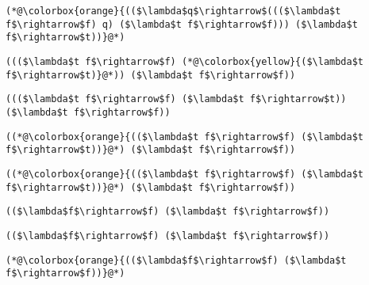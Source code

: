 \documentclass{beamer}
\begin{document}
\begin{frame}[fragile]{\CurrentSection}
\lstset{basicstyle=\ttfamily\small}\lstset{numbers=none}\lstset{language=ML}\begin{lstlisting}
(*@\colorbox{orange}{(($\lambda$q$\rightarrow$((($\lambda$t f$\rightarrow$f) q) ($\lambda$t f$\rightarrow$f))) ($\lambda$t f$\rightarrow$t))}@*)
\end{lstlisting}
\pause\lstset{language=ML}\begin{lstlisting}
((($\lambda$t f$\rightarrow$f) (*@\colorbox{yellow}{($\lambda$t f$\rightarrow$t)}@*)) ($\lambda$t f$\rightarrow$f))
\end{lstlisting}

\end{frame}

\begin{frame}[fragile]{\CurrentSection}
\lstset{basicstyle=\ttfamily\small}\lstset{numbers=none}\lstset{language=ML}\begin{lstlisting}
((($\lambda$t f$\rightarrow$f) ($\lambda$t f$\rightarrow$t)) ($\lambda$t f$\rightarrow$f))
\end{lstlisting}
\pause\lstset{language=ML}\begin{lstlisting}
((*@\colorbox{orange}{(($\lambda$t f$\rightarrow$f) ($\lambda$t f$\rightarrow$t))}@*) ($\lambda$t f$\rightarrow$f))
\end{lstlisting}

\end{frame}

\begin{frame}[fragile]{\CurrentSection}
\lstset{basicstyle=\ttfamily\small}\lstset{numbers=none}\lstset{language=ML}\begin{lstlisting}
((*@\colorbox{orange}{(($\lambda$t f$\rightarrow$f) ($\lambda$t f$\rightarrow$t))}@*) ($\lambda$t f$\rightarrow$f))
\end{lstlisting}
\pause\lstset{language=ML}\begin{lstlisting}
(($\lambda$f$\rightarrow$f) ($\lambda$t f$\rightarrow$f))
\end{lstlisting}

\end{frame}

\begin{frame}[fragile]{\CurrentSection}
\lstset{basicstyle=\ttfamily\small}\lstset{numbers=none}\lstset{language=ML}\begin{lstlisting}
(($\lambda$f$\rightarrow$f) ($\lambda$t f$\rightarrow$f))
\end{lstlisting}
\pause\lstset{language=ML}\begin{lstlisting}
(*@\colorbox{orange}{(($\lambda$f$\rightarrow$f) ($\lambda$t f$\rightarrow$f))}@*)
\end{lstlisting}

\end{frame}
\end{document}
